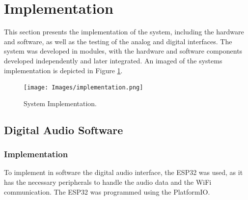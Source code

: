 \section{Implementation}

This section presents the implementation of the system, including the hardware and software, as well as the testing of the analog and digital interfaces. The system was developed in modules, with the hardware and software components developed independently and later integrated. An imaged of the systems implementation is depicted in Figure \ref{fig:systemImplementation}.

\begin{figure}[H]
    \centering
    \texttt{[image: Images/implementation.png]}
    \caption{System Implementation.}
    \label{fig:systemImplementation}
\end{figure}

\subsection{Digital Audio Software}

\subsubsection{Implementation}

To implement in software the digital audio interface, the ESP32 was used, as it has the necessary peripherals to handle the audio data and the WiFi communication. The ESP32 was programmed using the PlatformIO.

